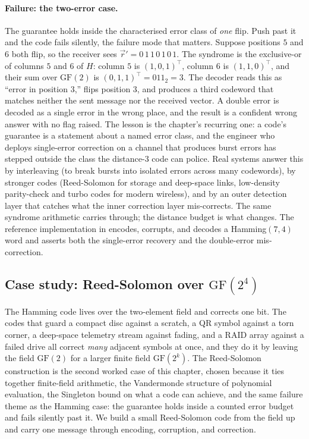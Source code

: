 \paragraph{Failure: the two-error case.}
The guarantee holds inside the characterised error class of
\emph{one} flip. Push past it and the code fails silently, the
failure mode that matters. Suppose positions $5$ and $6$ both flip,
so the receiver sees $\vec{r}' = 0\,1\,1\,0\,1\,0\,1$. The syndrome
is the exclusive-or of columns $5$ and $6$ of $H$: column $5$ is
$(1, 0, 1)^{\!\top}$, column $6$ is $(1, 1, 0)^{\!\top}$, and their
sum over $\mathrm{GF}(2)$ is $(0, 1, 1)^{\!\top} = 011_{2} = 3$. The
decoder reads this as ``error in position $3$,'' flips position $3$,
and produces a third codeword that matches neither the sent message
nor the received vector. A double error is decoded as a single error
in the wrong place, and the result is a confident wrong answer with
no flag raised. The lesson is the chapter's recurring one: a code's
guarantee is a statement about a named error class, and the engineer
who deploys single-error correction on a channel that produces burst
errors has stepped outside the class the distance-$3$ code can
police. Real systems answer this by interleaving (to break bursts
into isolated errors across many codewords), by stronger codes
(Reed-Solomon for storage and deep-space links, low-density
parity-check and turbo codes for modern wireless), and by an outer
detection layer that catches what the inner correction layer
mis-corrects. The same syndrome arithmetic carries through; the
distance budget is what changes. The reference implementation in
encodes, corrupts, and decodes a Hamming$(7, 4)$ word and asserts
both the single-error recovery and the double-error mis-correction.

\subsection{Case study: Reed-Solomon over \texorpdfstring{$\mathrm{GF}(2^{4})$}{GF(16)}}

The Hamming code lives over the two-element field and corrects one
bit. The codes that guard a compact disc against a scratch, a QR
symbol against a torn corner, a deep-space telemetry stream against
fading, and a RAID array against a failed drive all correct
\emph{many} adjacent symbols at once, and they do it by leaving the
field $\mathrm{GF}(2)$ for a larger finite field $\mathrm{GF}(2^{k})$.
The Reed-Solomon construction is the second worked case of this
chapter, chosen because it ties together finite-field arithmetic, the
Vandermonde structure of polynomial evaluation, the Singleton bound
on what a code can achieve, and the same failure theme as the Hamming
case: the guarantee holds inside a counted error budget and fails
silently past it. We build a small Reed-Solomon code from the field
up and carry one message through encoding, corruption, and
correction.

